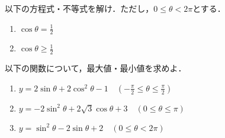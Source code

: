 \begin{question}
	以下の方程式・不等式を解け．ただし，$0 \leq \theta < 2\pi$とする．
	\begin{enumerate}[itemsep=2ex, label*=(\arabic*)]
		\item $\displaystyle \cos\theta = \frac{1}{2}$
		\item $\displaystyle \cos\theta \geq \frac{1}{2}$
	\end{enumerate}
\end{question}

\begin{question}
	以下の関数について，最大値・最小値を求めよ．
	\begin{enumerate}[itemsep=2ex, label*=(\arabic*)]
		\item $\displaystyle y = 2\sin\theta + 2\cos^2\theta - 1 \quad\left(-\frac{\pi}{2} \leq \theta \leq \frac{\pi}{2}\right)$
		\item $\displaystyle y = -2\sin^2\theta + 2\sqrt{3}\cos\theta + 3 \quad(0 \leq \theta \leq \pi)$
		\item $\displaystyle y = \sin^2\theta - 2\sin\theta + 2 \quad(0 \leq \theta < 2\pi)$
	\end{enumerate}
\end{question}